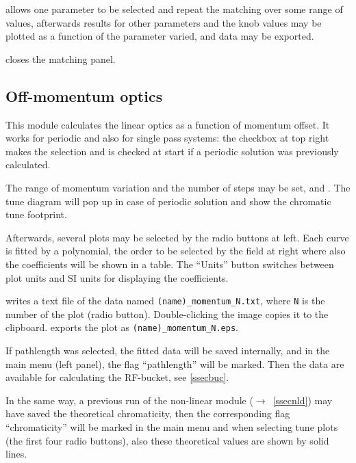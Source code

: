 \documentclass[12pt]{article}
\newcommand{\see}{\mbox{$\rightarrow$~}}
\newcommand\todo[1]{$\Longrightarrow$ {\em #1} }
\newcommand\button[1]{\fbox{\small\bf #1}}
\newcommand\chkbox[1]{\fbox{\small $\circ\,$#1}}
\begin{document}
\button{scan} allows one parameter to be selected and repeat the matching over some range of values, afterwards results for other parameters and the knob values may be plotted as a function of the parameter varied, and data may be exported.

\button{cancel} closes the matching panel.



\subsection{\label{ssecmom}Off-momentum optics}

This module calculates the linear optics as a function of momentum offset.
It works for periodic and also for single pass systems: the
checkbox at top right makes the selection and is checked at start if a periodic
solution was previously calculated.

The range of momentum variation and the number of steps may be set, and \button{Go}. The tune diagram will pop up in case of periodic solution and show the chromatic tune footprint.

Afterwards, several plots may be selected by the radio buttons at left.
Each curve is fitted by a polynomial, the order to be selected by the
field at right where also the coefficients will be shown in a table.
The ``Units'' button switches between plot units and SI units for displaying
the coefficients.


\button{$\rightarrow$TXT} writes a text file of the data named
{\tt (name)\_momentum\_N.txt}, where {\tt N} is
the number of the plot (radio button).
Double-clicking the image copies it to the clipboard.\button{$\rightarrow$EPS} exports the plot as {\tt (name)\_momentum\_N.eps}.

If pathlength \chkbox{Dpath} was selected, the fitted data will be saved internally, and in the main menu (left panel), the flag ``pathlength'' will be marked. Then the data are available for calculating the RF-bucket, see \ref{ssecbuc}.

In the same way, a previous run of the non-linear module (\see\ref{ssecnld}) may have saved the theoretical chromaticity, then the corresponding flag ``chromaticity'' will be marked in the main menu and when selecting tune plots (the first four radio buttons), also these theoretical values are shown by solid lines.\\
\end{document}
